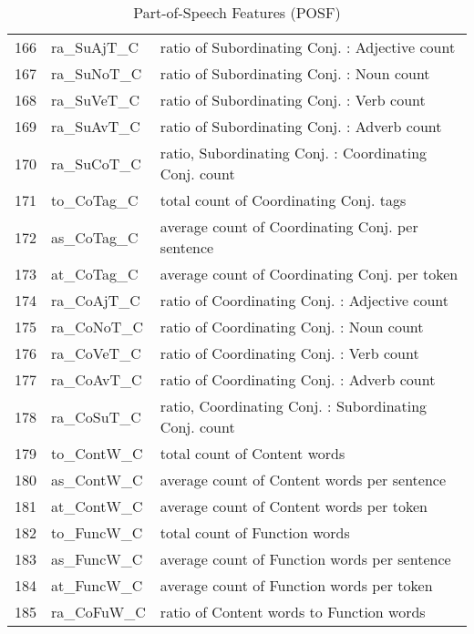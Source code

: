 \documentclass[11pt]{article}
\begin{document}
\begin{table}[H]
{\begin{tabular}{l@{\hspace{0.3ex}}|l@{\hspace{0.3ex}}|l@{\hspace{0.3ex}}}
    166   & ra\_SuAjT\_C   & ratio of Subordinating Conj. : Adjective count            \\
    167   & ra\_SuNoT\_C   & ratio of Subordinating Conj. : Noun count                 \\
    168   & ra\_SuVeT\_C   & ratio of Subordinating Conj. : Verb count                 \\
    169   & ra\_SuAvT\_C   & ratio of Subordinating Conj. : Adverb count               \\
    170   & ra\_SuCoT\_C   & ratio, Subordinating Conj. : Coordinating Conj. count \\
    171   & to\_CoTag\_C   & total count of Coordinating Conj. tags                               \\
    172   & as\_CoTag\_C   & average count of Coordinating Conj. per sentence                \\
    173   & at\_CoTag\_C   & average count of Coordinating Conj. per token                   \\
    174   & ra\_CoAjT\_C   & ratio of Coordinating Conj. : Adjective count             \\
    175   & ra\_CoNoT\_C   & ratio of Coordinating Conj. : Noun count                  \\
    176   & ra\_CoVeT\_C   & ratio of Coordinating Conj. : Verb count                  \\
    177   & ra\_CoAvT\_C   & ratio of Coordinating Conj. : Adverb count                \\
    178   & ra\_CoSuT\_C   & ratio, Coordinating Conj. : Subordinating Conj. count \\
    179   & to\_ContW\_C   & total count of Content words                           \\
    180   & as\_ContW\_C   & average count of Content words per sentence            \\
    181   & at\_ContW\_C   & average count of Content words per token               \\
    182   & to\_FuncW\_C   & total count of Function words                          \\
    183   & as\_FuncW\_C   & average count of Function words per sentence           \\
    184   & at\_FuncW\_C   & average count of Function words per token              \\
    185   & ra\_CoFuW\_C   & ratio of Content words to Function words               \\ \hline             
    \end{tabular}
    }
\caption{\label{Append} Part-of-Speech Features (POSF)}
\end{table}
\end{document}

